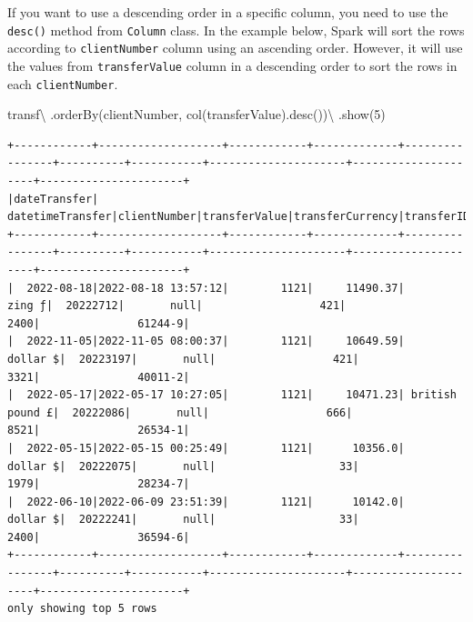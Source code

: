 \documentclass[
  11pt,
  letterpaper,
  DIV=11,
  numbers=noendperiod]{scrreprt}
\newenvironment{Shaded}{\begin{snugshade}}{\end{snugshade}}
\newcommand{\DecValTok}[1]{\textcolor[rgb]{0.68,0.00,0.00}{#1}}
\newcommand{\NormalTok}[1]{\textcolor[rgb]{0.00,0.23,0.31}{#1}}
\newcommand{\OperatorTok}[1]{\textcolor[rgb]{0.37,0.37,0.37}{#1}}
\newcommand{\StringTok}[1]{\textcolor[rgb]{0.13,0.47,0.30}{#1}}
\begin{document}
If you want to use a descending order in a specific column, you need to
use the \texttt{desc()} method from \texttt{Column} class. In the
example below, Spark will sort the rows according to
\texttt{clientNumber} column using an ascending order. However, it will
use the values from \texttt{transferValue} column in a descending order
to sort the rows in each \texttt{clientNumber}.

\begin{Shaded}
\begin{Highlighting}[]
\NormalTok{transf}\OperatorTok{\textbackslash{}}
\NormalTok{  .orderBy(}\StringTok{\textquotesingle{}clientNumber\textquotesingle{}}\NormalTok{, col(}\StringTok{\textquotesingle{}transferValue\textquotesingle{}}\NormalTok{).desc())}\OperatorTok{\textbackslash{}}
\NormalTok{  .show(}\DecValTok{5}\NormalTok{)}
\end{Highlighting}
\end{Shaded}

\begin{verbatim}
+------------+-------------------+------------+-------------+----------------+----------+-----------+---------------------+---------------------+----------------------+
|dateTransfer|   datetimeTransfer|clientNumber|transferValue|transferCurrency|transferID|transferLog|destinationBankNumber|destinationBankBranch|destinationBankAccount|
+------------+-------------------+------------+-------------+----------------+----------+-----------+---------------------+---------------------+----------------------+
|  2022-08-18|2022-08-18 13:57:12|        1121|     11490.37|          zing ƒ|  20222712|       null|                  421|                 2400|               61244-9|
|  2022-11-05|2022-11-05 08:00:37|        1121|     10649.59|        dollar $|  20223197|       null|                  421|                 3321|               40011-2|
|  2022-05-17|2022-05-17 10:27:05|        1121|     10471.23| british pound £|  20222086|       null|                  666|                 8521|               26534-1|
|  2022-05-15|2022-05-15 00:25:49|        1121|      10356.0|        dollar $|  20222075|       null|                   33|                 1979|               28234-7|
|  2022-06-10|2022-06-09 23:51:39|        1121|      10142.0|        dollar $|  20222241|       null|                   33|                 2400|               36594-6|
+------------+-------------------+------------+-------------+----------------+----------+-----------+---------------------+---------------------+----------------------+
only showing top 5 rows
\end{verbatim}
\end{document}
